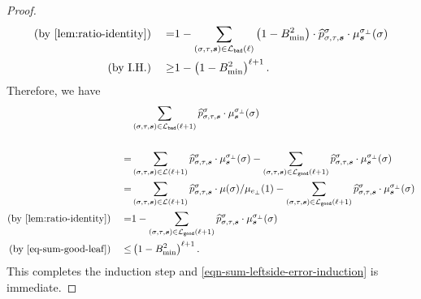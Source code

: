 \documentclass[11pt]{article}
\def\!#1{\mathtt{#1}}
\newcommand{\seqS}{\boldsymbol{s}}
\begin{document}
\begin{proof}
\begin{equation}
\begin{aligned}
 \left(\text{by \Cref{lem:ratio-identity}}\right) \quad = & 1 - \sum_{(\sigma,\tau, \seqS)\in \+L_{\!{bad}}(\ell)}\left(1-B_{\min}^2\right)\cdot\widehat{p}^{\sigma}_{\sigma,\tau,\seqS}\cdot \mu^{\sigma_{\bot}}_{\seqS}(\sigma)\\
\left(\text{by I.H.}\right)\quad \geq & 1 - \left(1-B_{\min}^2\right)^{\ell+1}.
\end{aligned}
\end{equation}
Therefore, we have
\begin{align*}
    &\sum_{(\sigma,\tau, \seqS)\in \+L_{\!{bad}}(\ell+1)} \widehat{p}^{\sigma}_{\sigma,\tau,\seqS}\cdot \mu^{\sigma_{\bot}}_{\seqS}(\sigma)\\\\
    =&\sum_{(\sigma,\tau, \seqS)\in \+L(\ell+1)} \widehat{p}^{\sigma}_{\sigma,\tau,\seqS}\cdot \mu^{\sigma_{\bot}}_{\seqS}(\sigma) - \sum_{(\sigma,\tau, \seqS)\in \+L_{\!{good}}(\ell+1)}\widehat{p}^{\sigma}_{\sigma,\tau,\seqS}\cdot \mu^{\sigma_{\bot}}_{\seqS}(\sigma) \\
    =&\sum_{(\sigma,\tau, \seqS)\in \+L(\ell+1)} \widehat{p}^{\sigma}_{\sigma,\tau,\seqS}\cdot \mu(\sigma)/\mu_{e_{\bot}}(1) - \sum_{(\sigma,\tau, \seqS)\in \+L_{\!{good}}(\ell+1)}\widehat{p}^{\sigma}_{\sigma,\tau,\seqS}\cdot \mu^{\sigma_{\bot}}_{\seqS}(\sigma)\\
\left(\text{by \Cref{lem:ratio-identity}}\right) \quad    =&1 - \sum_{(\sigma,\tau, \seqS)\in \+L_{\!{good}}(\ell+1)}\widehat{p}^{\sigma}_{\sigma,\tau,\seqS}\cdot \mu^{\sigma_{\bot}}_{\seqS}(\sigma)\\
\left(\text{by \eqref{eq-sum-good-leaf}}\right) \quad   \leq &\left(1-B_{\min}^2\right)^{\ell+1}.
\end{align*}
This completes the induction step and \eqref{eqn-sum-leftside-error-induction} is immediate.


\end{proof}
\end{document}
